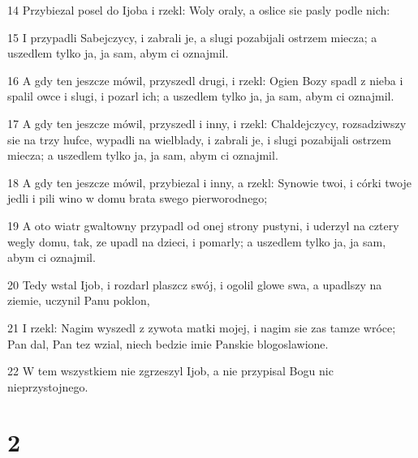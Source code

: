 \par 14 Przybiezal posel do Ijoba i rzekl: Woly oraly, a oslice sie pasly podle nich:
\par 15 I przypadli Sabejczycy, i zabrali je, a slugi pozabijali ostrzem miecza; a uszedlem tylko ja, ja sam, abym ci oznajmil.
\par 16 A gdy ten jeszcze mówil, przyszedl drugi, i rzekl: Ogien Bozy spadl z nieba i spalil owce i slugi, i pozarl ich; a uszedlem tylko ja, ja sam, abym ci oznajmil.
\par 17 A gdy ten jeszcze mówil, przyszedl i inny, i rzekl: Chaldejczycy, rozsadziwszy sie na trzy hufce, wypadli na wielblady, i zabrali je, i slugi pozabijali ostrzem miecza; a uszedlem tylko ja, ja sam, abym ci oznajmil.
\par 18 A gdy ten jeszcze mówil, przybiezal i inny, a rzekl: Synowie twoi, i córki twoje jedli i pili wino w domu brata swego pierworodnego;
\par 19 A oto wiatr gwaltowny przypadl od onej strony pustyni, i uderzyl na cztery wegly domu, tak, ze upadl na dzieci, i pomarly; a uszedlem tylko ja, ja sam, abym ci oznajmil.
\par 20 Tedy wstal Ijob, i rozdarl plaszcz swój, i ogolil glowe swa, a upadlszy na ziemie, uczynil Panu poklon,
\par 21 I rzekl: Nagim wyszedl z zywota matki mojej, i nagim sie zas tamze wróce; Pan dal, Pan tez wzial, niech bedzie imie Panskie blogoslawione.
\par 22 W tem wszystkiem nie zgrzeszyl Ijob, a nie przypisal Bogu nic nieprzystojnego.

\chapter{2}

